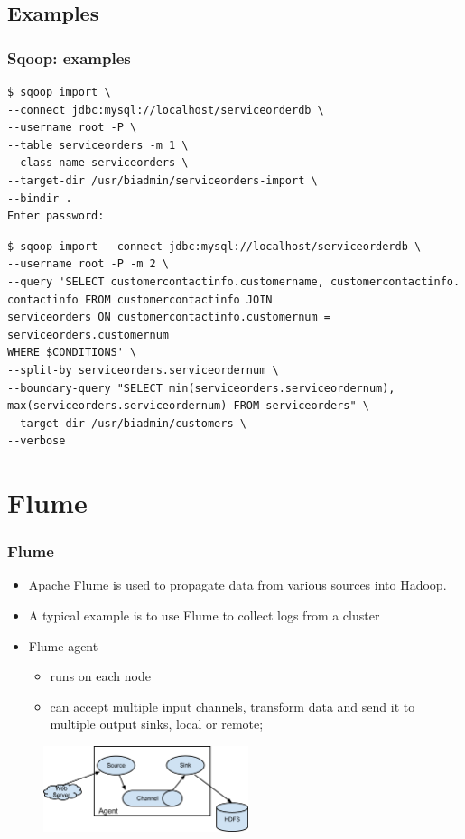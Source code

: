\documentclass{beamer}
\begin{document}
\subsection{Examples}
\begin{frame}[fragile]
 \frametitle{Sqoop: examples}
{\color{mycolorcli}
  \begin{lstlisting}[frame=single, basicstyle=\tiny]
$ sqoop import \
--connect jdbc:mysql://localhost/serviceorderdb \
--username root -P \
--table serviceorders -m 1 \
--class-name serviceorders \
--target-dir /usr/biadmin/serviceorders-import \
--bindir .
Enter password:
\end{lstlisting}

\begin{lstlisting}[frame=single, basicstyle=\tiny]
$ sqoop import --connect jdbc:mysql://localhost/serviceorderdb \
--username root -P -m 2 \
--query 'SELECT customercontactinfo.customername, customercontactinfo.
contactinfo FROM customercontactinfo JOIN
serviceorders ON customercontactinfo.customernum = serviceorders.customernum
WHERE $CONDITIONS' \
--split-by serviceorders.serviceordernum \
--boundary-query "SELECT min(serviceorders.serviceordernum),
max(serviceorders.serviceordernum) FROM serviceorders" \
--target-dir /usr/biadmin/customers \
--verbose
\end{lstlisting}

}

\end{frame}

\section{Flume}
\begin{frame}
 \frametitle{Flume}
 \begin{itemize}
  \item Apache Flume is used to propagate data from various sources into Hadoop.
  \item A typical example is to use Flume to collect logs from a cluster
  \item Flume agent
    \begin{itemize}
      \item runs on each node
      \item can accept multiple input channels, transform data and send it to multiple output sinks, local or remote;
    \end{itemize}
 \end{itemize}

 \begin{figure}[h]
 \includegraphics[width=6cm]{graphs/DevGuide_image00.png}
 \end{figure}
 
\end{frame}
\end{document}
